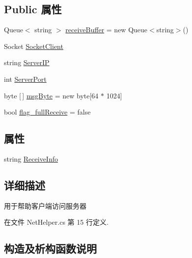 \subsection*{Public 属性}
\begin{DoxyCompactItemize}
\item 
Queue$<$ string $>$ \hyperlink{classcustom__cloud_1_1_net_helper_a651681dc0f11b2d31f606ca49ade97d3}{receive\+Buffer} = new Queue$<$string$>$()
\item 
Socket \hyperlink{classcustom__cloud_1_1_net_helper_a3a3ac000b75ac4a7a1a280cffe454bf3}{Socket\+Client}
\item 
string \hyperlink{classcustom__cloud_1_1_net_helper_afacd28fbe040a6c8f23f9ca63c4417a5}{Server\+IP}
\item 
int \hyperlink{classcustom__cloud_1_1_net_helper_ad4cb3bbc4fa803160957e8d2543448b8}{Server\+Port}
\item 
byte \mbox{[}$\,$\mbox{]} \hyperlink{classcustom__cloud_1_1_net_helper_acb40b073453e2af4c74ac9ba9737d8d5}{msg\+Byte} = new byte\mbox{[}64 $\ast$ 1024\mbox{]}
\item 
bool \hyperlink{classcustom__cloud_1_1_net_helper_ae2f924830737bf8ef53acda3de6ccc30}{flag\+\_\+full\+Receive} = false
\end{DoxyCompactItemize}
\subsection*{属性}
\begin{DoxyCompactItemize}
\item 
string \hyperlink{classcustom__cloud_1_1_net_helper_af8ff618b2e04688c47e2a706bab175e8}{Receive\+Info}
\end{DoxyCompactItemize}


\subsection{详细描述}
用于帮助客户端访问服务器 



在文件 Net\+Helper.\+cs 第 15 行定义.



\subsection{构造及析构函数说明}
\mbox{\label{classcustom__cloud_1_1_net_helper_a19693e7d58749390dcfd6a702cc6874a}} 
